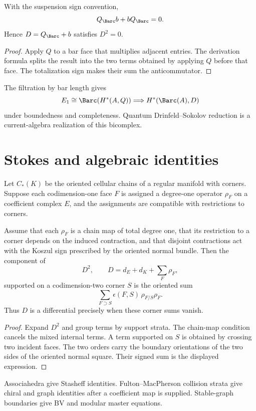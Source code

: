 \begin{proposition}
With the suspension sign convention,
\[
 Q_{\Barc}b+bQ_{\Barc}=0.
\]
Hence $D=Q_{\Barc}+b$ satisfies $D^2=0$.
\end{proposition}
\begin{proof}
Apply $Q$ to a bar face that multiplies adjacent entries. The derivation formula splits the result into the two terms obtained by applying $Q$ before that face. The totalization sign makes their sum the anticommutator.
\end{proof}

The filtration by bar length gives
\[
 E_1\cong\Barc(H^*(A,Q))
 \Longrightarrow H^*(\Barc(A),D)
\]
under boundedness and completeness. Quantum Drinfeld--Sokolov reduction is a current-algebra realization of this bicomplex.

\chapter{Stokes and algebraic identities}
Let $C_*(K)$ be the oriented cellular chains of a regular manifold with corners. Suppose each codimension-one face $F$ is assigned a degree-one operator $\rho_F$ on a coefficient complex $E$, and the assignments are compatible with restrictions to corners.

\begin{theorem}
Assume that each $\rho_F$ is a chain map of total degree one, that its restriction to a corner depends on the induced contraction, and that disjoint contractions act with the Koszul sign prescribed by the oriented normal bundle. Then the component of
\[
 D^2,\qquad D=d_E+d_K+\sum_F\rho_F,
\]
supported on a codimension-two corner $S$ is the oriented sum
\[
 \sum_{F\supset S}\epsilon(F,S)\,\rho_{F/S}\rho_F.
\]
Thus $D$ is a differential precisely when these corner sums vanish.
\end{theorem}
\begin{proof}
Expand $D^2$ and group terms by support strata. The chain-map condition cancels the mixed internal terms. A term supported on $S$ is obtained by crossing two incident faces. The two orders carry the boundary orientations of the two sides of the oriented normal square. Their signed sum is the displayed expression.
\end{proof}

Associahedra give Stasheff identities. Fulton--MacPherson collision strata give chiral and graph identities after a coefficient map is supplied. Stable-graph boundaries give BV and modular master equations.

